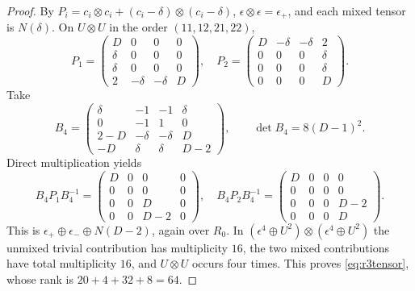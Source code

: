 \begin{proof}
By $P_i=c_i\otimes c_i+(c_i-\delta)\otimes(c_i-\delta)$,
$\epsilon\otimes\epsilon=\epsilon_+$, and each mixed tensor is
$N(\delta)$. On $U\otimes U$ in the order $(11,12,21,22)$,
\[
 P_1=\begin{pmatrix}D&0&0&0\\\delta&0&0&0\\\delta&0&0&0\\
                         2&-\delta&-\delta&D\end{pmatrix},\quad
 P_2=\begin{pmatrix}D&-\delta&-\delta&2\\0&0&0&\delta\\
                         0&0&0&\delta\\0&0&0&D\end{pmatrix}.
\]
Take
\[
 B_4=\begin{pmatrix}
 \delta&-1&-1&\delta\\0&-1&1&0\\
 2-D&-\delta&-\delta&D\\-D&\delta&\delta&D-2
 \end{pmatrix},\qquad \det B_4=8(D-1)^2.
\]
Direct multiplication yields
\[
 B_4P_1B_4^{-1}=\begin{pmatrix}D&0&0&0\\0&0&0&0\\0&0&D&0\\0&0&D-2&0\end{pmatrix},
\quad
 B_4P_2B_4^{-1}=\begin{pmatrix}D&0&0&0\\0&0&0&0\\0&0&0&D-2\\0&0&0&D\end{pmatrix}.
\]
This is $\epsilon_+\oplus\epsilon_-\oplus N(D-2)$, again over $R_0$.
In $(\epsilon^4\oplus U^2)\otimes(\epsilon^4\oplus U^2)$ the unmixed
trivial contribution has multiplicity $16$, the two mixed contributions
have total multiplicity $16$, and $U\otimes U$ occurs four times.
This proves \eqref{eq:r3tensor}, whose rank is $20+4+32+8=64$.


\end{proof}
